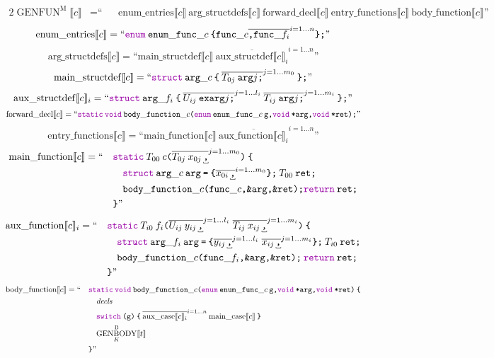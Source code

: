 \documentclass[a4paper,fleqn]{article}
\newcommand{\BRA}[1]{\llbracket #1 \rrbracket}
\DeclareMathOperator{\genbody}{GENBODY}
\newcommand{\genbodyb}[2]{\genbody^\mathrm{B}_{#1}\BRA{#2}}
\DeclareMathOperator{\genfunop}{GENFUN}
\newcommand{\genfunm}[1]{\genfunop^\mathrm{M}\BRA{#1}}
\newcommand{\enumentries}[1]{\mathrm{enum\_entries}\BRA{#1}}
\newcommand{\argstructdefs}[1]{\mathrm{arg\_structdefs}\BRA{#1}}
\newcommand{\mainstructdef}[1]{\mathrm{main\_structdef}\BRA{#1}}
\newcommand{\auxstructdef}[2]{\mathrm{aux\_structdef}\BRA{#1}_{#2}}
\newcommand{\forwarddecl}[1]{\mathrm{forward\_decl}\BRA{#1}}
\newcommand{\entryfunctions}[1]{\mathrm{entry\_functions}\BRA{#1}}
\newcommand{\mainfunction}[1]{\mathrm{main\_function}\BRA{#1}}
\newcommand{\auxfunction}[2]{\mathrm{aux\_function}\BRA{#1}_{#2}}
\newcommand{\bodyfunction}[1]{\mathrm{body\_function}\BRA{#1}}
\newcommand{\auxcase}[2]{\mathrm{aux\_case}\BRA{#1}_{#2}}
\newcommand{\maincase}[1]{\mathrm{main\_case}\BRA{#1}}
\newcommand{\ldq}{\text{``}}
\newcommand{\rdq}{\text{''}}
\newcommand{\dq}[1]{\text{``}#1\text{''}}
\newcommand{\ttparen}[1]{\texttt{(}#1\texttt{)}}
\newcommand{\ttlbrace}{\texttt{\char '173}}
\newcommand{\ttrbrace}{\texttt{\char '175}}
\newcommand{\ttbrace}[1]{\ttlbrace#1\ttrbrace}
\newcommand{\tteq}{\texttt{=}}
\newcommand{\ttsemi}{\texttt{;}}
\newcommand{\ttcomma}{\texttt{,}}
\newcommand{\ttstar}{\texttt{*}}
\newcommand{\ttamp}{\texttt{\&}}
\newcommand{\kwswitch}{\mbox{\color{myviolet}\ttfamily switch}}
\newcommand{\kwstruct}{\mbox{\color{myviolet}\ttfamily struct}}
\newcommand{\kwvoid}{\mbox{\color{myviolet}\ttfamily void}}
\newcommand{\kwCreturn}{\mbox{\color{myviolet}\ttfamily return}}
\newcommand{\kwenum}{\mbox{\color{myviolet}\ttfamily enum}}
\newcommand{\kwstatic}{\mbox{\color{myviolet}\ttfamily static}}
\newcommand{\repopi}[3]{\overline{#1\underbracket[0.4pt][1pt]{#2}}^{#3}}
\newcommand{\repi}[2]{\overline{#1}^{#2}}
\begin{document}
\begin{alignat*}{2}
  \genfunm{c} &= \ldq && \enumentries{c}~\argstructdefs{c}~\forwarddecl{c}~\entryfunctions{c}~\bodyfunction{c} \rdq
\end{alignat*}
\[ \enumentries{c} = \dq{\kwenum\:\mathtt{enum\_func\_}c\:\ttbrace{ \mathtt{func\_}c \repi{\ttcomma \mathtt{func\_}f_i}{i=1\ldots n} }\ttsemi} \]
\[ \argstructdefs{c} = \dq{\mainstructdef{c}\:\repi{\auxstructdef{c}{i}}{i=1\ldots n} } \]
\[ \mainstructdef{c} = \dq{\kwstruct\:\mathtt{arg\_}c\:\ttbrace{\:\repi{T_{0j}\:\mathtt{arg}j\ttsemi}{j=1\ldots m_0} \:}\ttsemi} \]
\[ \auxstructdef{c}{i} = \dq{\kwstruct\:\mathtt{arg\_}f_i\:\ttbrace{\:\repi{U_{ij}\:\mathtt{exarg}j\ttsemi}{j=1\ldots l_i}\:\repi{T_{ij}\:\mathtt{arg}j\ttsemi}{j=1\ldots m_i}\:}\ttsemi} \]
\[ \forwarddecl{c} = \dq{\kwstatic\:\kwvoid\:\mathtt{body\_function\_}c\ttparen{\kwenum\:\mathtt{enum\_func\_}c\:\mathtt{g}\ttcomma \kwvoid\:\mathtt{\ttstar arg}\ttcomma \kwvoid\:\mathtt{\ttstar ret}}\ttsemi} \]
\[ \entryfunctions{c} = \dq{\mainfunction{c}\:\repi{\auxfunction{c}{i}}{i=1\ldots n}} \]
\begin{alignat*}{2}
  \mainfunction{c} &= \ldq && \kwstatic\:T_{00}\:c\ttparen{\repopi{T_{0j}\:x_{0j}}{\ttcomma}{j=1\ldots m_0}}\:\ttlbrace \\
  & && \quad \kwstruct\:\mathtt{arg\_}c\:\mathtt{arg}\:\tteq\:\ttbrace{ \repopi{x_{0i}}{\ttcomma}{i=1\ldots m_0} }\ttsemi\:T_{00}\:\mathtt{ret}\ttsemi \\
  & && \quad \mathtt{body\_function\_}c\ttparen{\mathtt{func\_}c\ttcomma \ttamp\mathtt{arg}\ttcomma \ttamp\mathtt{ret}}\ttsemi \kwCreturn\:\mathtt{ret}\ttsemi \\
  & && \ttrbrace \rdq
\end{alignat*}
\begin{alignat*}{2}
  \auxfunction{c}{i} &= \ldq && \kwstatic\:T_{i0}\:f_i\ttparen{\repopi{U_{ij}\:y_{ij}}{\ttcomma}{j=1\ldots l_i}\; \repopi{T_{ij}\:x_{ij}}{\ttcomma}{j=1\ldots m_i}}\:\ttlbrace \\
  & && \quad \kwstruct\:\mathtt{arg\_}f_i\:\mathtt{arg}\:\tteq\:\ttbrace{ \repopi{y_{ij}}{\ttcomma}{j=1\ldots l_i}\; \repopi{x_{ij}}{\ttcomma}{j=1\ldots m_i} }\ttsemi\:T_{i0}\:\mathtt{ret}\ttsemi\\
  & && \quad \mathtt{body\_function\_}c\ttparen{\mathtt{func\_}f_i\ttcomma \ttamp\mathtt{arg}\ttcomma \ttamp\mathtt{ret}}\ttsemi\:\kwCreturn\:\mathtt{ret}\ttsemi \\
  & && \ttrbrace \rdq
\end{alignat*}
\begin{alignat*}{2}
  \bodyfunction{c} &= \ldq
    && \kwstatic\:\kwvoid\:\mathtt{body\_function\_}c\ttparen{\kwenum\:\mathtt{enum\_func\_}c\:\mathtt{g}\ttcomma \kwvoid\:\ttstar\mathtt{arg}\ttcomma \kwvoid\:\ttstar\mathtt{ret}}\:\ttlbrace \\
  & && \quad \mathit{decls} \\
  & && \quad \kwswitch\:\ttparen{\mathtt{g}}\:\ttbrace{\:\repi{\auxcase{c}{i}}{i=1\ldots n} \:\maincase{c}\:} \\
  & && \quad {\genbodyb{K}{t}} \\
  & && \ttrbrace \rdq
\end{alignat*}
\end{document}
